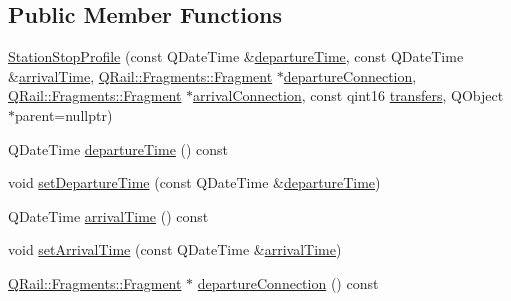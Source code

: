 \subsection*{Public Member Functions}
\begin{DoxyCompactItemize}
\item 
\mbox{\hyperlink{classQRail_1_1RouterEngine_1_1StationStopProfile_ae528f7c8cecbb94459a2355efc1063bf}{Station\+Stop\+Profile}} (const Q\+Date\+Time \&\mbox{\hyperlink{classQRail_1_1RouterEngine_1_1StationStopProfile_ab7191d0c2f01f52d360d0dc638857c23}{departure\+Time}}, const Q\+Date\+Time \&\mbox{\hyperlink{classQRail_1_1RouterEngine_1_1StationStopProfile_a5b79ffa346928ae6362892f00539b2d8}{arrival\+Time}}, \mbox{\hyperlink{classQRail_1_1Fragments_1_1Fragment}{Q\+Rail\+::\+Fragments\+::\+Fragment}} $\ast$\mbox{\hyperlink{classQRail_1_1RouterEngine_1_1StationStopProfile_a53d2c7657b133546264a89cb309999bb}{departure\+Connection}}, \mbox{\hyperlink{classQRail_1_1Fragments_1_1Fragment}{Q\+Rail\+::\+Fragments\+::\+Fragment}} $\ast$\mbox{\hyperlink{classQRail_1_1RouterEngine_1_1StationStopProfile_ae06073b8f69ae105c0219234ebba77b8}{arrival\+Connection}}, const qint16 \mbox{\hyperlink{classQRail_1_1RouterEngine_1_1StationStopProfile_ac63915d0c5d865e3fdf02654d4ca53bc}{transfers}}, Q\+Object $\ast$parent=nullptr)
\item 
Q\+Date\+Time \mbox{\hyperlink{classQRail_1_1RouterEngine_1_1StationStopProfile_ab7191d0c2f01f52d360d0dc638857c23}{departure\+Time}} () const
\item 
void \mbox{\hyperlink{classQRail_1_1RouterEngine_1_1StationStopProfile_a2b84f467941aed7b3218dc6543a7c587}{set\+Departure\+Time}} (const Q\+Date\+Time \&\mbox{\hyperlink{classQRail_1_1RouterEngine_1_1StationStopProfile_ab7191d0c2f01f52d360d0dc638857c23}{departure\+Time}})
\item 
Q\+Date\+Time \mbox{\hyperlink{classQRail_1_1RouterEngine_1_1StationStopProfile_a5b79ffa346928ae6362892f00539b2d8}{arrival\+Time}} () const
\item 
void \mbox{\hyperlink{classQRail_1_1RouterEngine_1_1StationStopProfile_a671aec103e271ea3b964c7eec3cb2d5a}{set\+Arrival\+Time}} (const Q\+Date\+Time \&\mbox{\hyperlink{classQRail_1_1RouterEngine_1_1StationStopProfile_a5b79ffa346928ae6362892f00539b2d8}{arrival\+Time}})
\item 
\mbox{\hyperlink{classQRail_1_1Fragments_1_1Fragment}{Q\+Rail\+::\+Fragments\+::\+Fragment}} $\ast$ \mbox{\hyperlink{classQRail_1_1RouterEngine_1_1StationStopProfile_a53d2c7657b133546264a89cb309999bb}{departure\+Connection}} () const

\end{DoxyCompactItemize}
